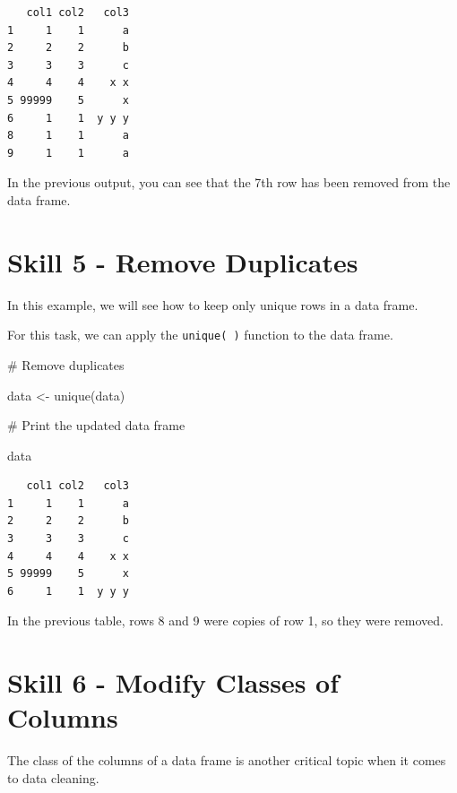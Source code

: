 \documentclass[
  letterpaper,
  DIV=11,
  numbers=noendperiod]{scrreprt}
\newenvironment{Shaded}{\begin{snugshade}}{\end{snugshade}}
\newcommand{\CommentTok}[1]{\textcolor[rgb]{0.37,0.37,0.37}{#1}}
\newcommand{\FunctionTok}[1]{\textcolor[rgb]{0.28,0.35,0.67}{#1}}
\newcommand{\NormalTok}[1]{\textcolor[rgb]{0.00,0.23,0.31}{#1}}
\newcommand{\OtherTok}[1]{\textcolor[rgb]{0.00,0.23,0.31}{#1}}
\begin{document}
\begin{verbatim}
   col1 col2   col3
1     1    1      a
2     2    2      b
3     3    3      c
4     4    4    x x
5 99999    5      x
6     1    1  y y y
8     1    1      a
9     1    1      a
\end{verbatim}

In the previous output, you can see that the 7th row has been removed
from the data frame.

\section*{Skill 5 - Remove
Duplicates}\label{skill-5---remove-duplicates}


In this example, we will see how to keep only unique rows in a data
frame.

For this task, we can apply the \texttt{unique(\ )} function to the data
frame.

\begin{Shaded}
\begin{Highlighting}[]
\CommentTok{\# Remove duplicates}

\NormalTok{data }\OtherTok{\textless{}{-}} \FunctionTok{unique}\NormalTok{(data)}

\CommentTok{\# Print the updated data frame}

\NormalTok{data}
\end{Highlighting}
\end{Shaded}

\begin{verbatim}
   col1 col2   col3
1     1    1      a
2     2    2      b
3     3    3      c
4     4    4    x x
5 99999    5      x
6     1    1  y y y
\end{verbatim}

In the previous table, rows 8 and 9 were copies of row 1, so they were
removed.

\section*{Skill 6 - Modify Classes of
Columns}\label{skill-6---modify-classes-of-columns}


The class of the columns of a data frame is another critical topic when
it comes to data cleaning.
\end{document}
